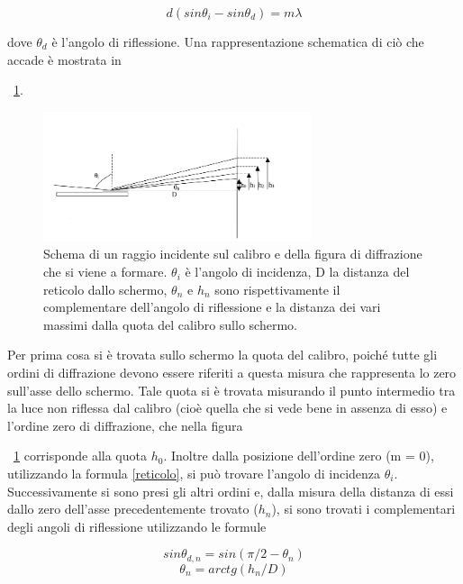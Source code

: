 \documentclass[a4paper,10pt]{article}
\begin{document}
\begin{equation}
d(sin\theta_i - sin\theta_d)= m\lambda
\label{reticolo}
\end{equation}

dove $\theta_d$ è l'angolo di riflessione.
Una rappresentazione schematica di ciò che accade è mostrata in \figurename{~\ref{fig:espa}.

\begin{figure}[H]
	\centering
	\includegraphics[width=0.7\textwidth]{../grafici/espa.png}
	\caption{Schema di un raggio incidente sul calibro e della figura di diffrazione che si viene a formare. $\theta_i$ è l'angolo di incidenza, D la distanza del reticolo dallo schermo, $\theta_n$ e $h_n$ sono rispettivamente il complementare dell'angolo di riflessione e la distanza dei vari massimi dalla quota del calibro sullo schermo.}
	\label{fig:espa}
\end{figure}

Per prima cosa si è trovata sullo schermo la quota del calibro, poiché tutte gli ordini di diffrazione devono essere riferiti a questa misura che rappresenta lo zero sull'asse dello schermo. Tale quota si è trovata misurando il punto intermedio tra la luce non riflessa dal calibro (cioè quella che si vede bene in assenza di esso) e l'ordine zero di diffrazione, che nella figura \figurename{~\ref{fig:espa} corrisponde alla quota $h_0$. Inoltre dalla posizione dell'ordine zero (m = 0), utilizzando la formula \ref{reticolo}, si può trovare l'angolo di incidenza $\theta_i$. Successivamente si sono presi gli altri ordini e, dalla misura della distanza di essi dallo zero dell'asse precedentemente trovato ($h_n$), si sono trovati i complementari degli angoli di riflessione utilizzando le formule

\begin{equation}
sin\theta_{d,n} = sin(\pi/2 - \theta_n)
\label{thetad}
\end{equation}
\begin{equation}
\theta_n = arctg(h_n/D)
\label{thetan}
\end{equation}

}}
\end{document}
